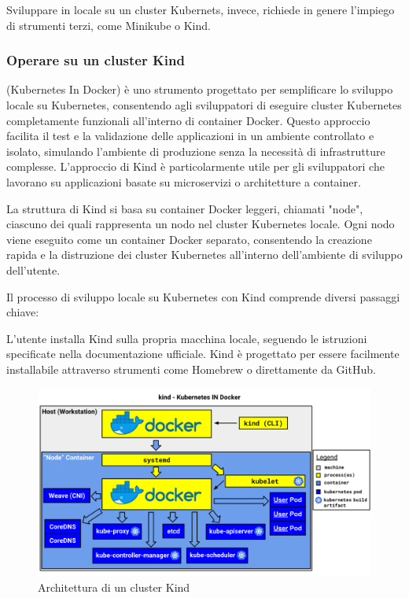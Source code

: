 Sviluppare in locale su un cluster Kubernets, invece, richiede in genere l'impiego di strumenti terzi, come Minikube o Kind.


\subsubsection{Operare su un cluster Kind}

 (Kubernetes In Docker) è uno strumento progettato per semplificare lo sviluppo locale su Kubernetes, consentendo agli sviluppatori di eseguire cluster Kubernetes completamente funzionali all'interno di container Docker. Questo approccio facilita il test e la validazione delle applicazioni in un ambiente controllato e isolato, simulando l'ambiente di produzione senza la necessità di infrastrutture complesse. L'approccio di Kind è particolarmente utile per gli sviluppatori che lavorano su applicazioni basate su microservizi o architetture a container.

La struttura di Kind si basa su container Docker leggeri, chiamati "node", ciascuno dei quali rappresenta un nodo nel cluster Kubernetes locale. Ogni nodo viene eseguito come un container Docker separato, consentendo la creazione rapida e la distruzione dei cluster Kubernetes all'interno dell'ambiente di sviluppo dell'utente.

Il processo di sviluppo locale su Kubernetes con Kind comprende diversi passaggi chiave:

L'utente installa Kind sulla propria macchina locale, seguendo le istruzioni specificate nella documentazione ufficiale. Kind è progettato per essere facilmente installabile attraverso strumenti come Homebrew o direttamente da GitHub.

\begin{figure}[h]
    \centering
    \includegraphics[width=\linewidth]{figures/ch3/kind.png}
    \caption[Architettura di un cluster Kind]{Architettura di un cluster Kind}
    \label{fig:cha3:kind}
\end{figure}


